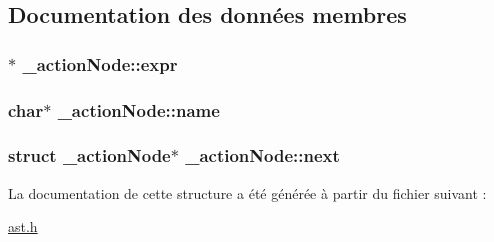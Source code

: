 \subsection{Documentation des données membres}
\hypertarget{struct__actionNode_af84de8f1ffa4d5152360f5f3048a149d}{
\subsubsection[{expr}]{$\ast$ \-\_\-action\-Node\-::expr}}\label{struct__actionNode_af84de8f1ffa4d5152360f5f3048a149d}
\hypertarget{struct__actionNode_a9c37da216f5c88b97c1af5456c8f98df}{
\subsubsection[{name}]{\setlength{\rightskip}{0pt plus 5cm}char$\ast$ \-\_\-action\-Node\-::name}}\label{struct__actionNode_a9c37da216f5c88b97c1af5456c8f98df}
\hypertarget{struct__actionNode_aaa6e5e1f58d751cd3723ca3553d1633e}{
\subsubsection[{next}]{\setlength{\rightskip}{0pt plus 5cm}struct {\bf \-\_\-action\-Node}$\ast$ \-\_\-action\-Node\-::next}}\label{struct__actionNode_aaa6e5e1f58d751cd3723ca3553d1633e}


La documentation de cette structure a été générée à partir du fichier suivant \-:\begin{DoxyCompactItemize}
\item 
\hyperlink{ast_8h}{ast.\-h}\end{DoxyCompactItemize}
